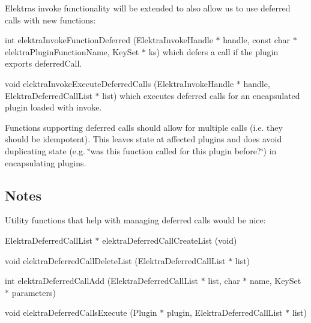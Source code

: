 \begin{DoxyItemize}
\item Elektra\textquotesingle{}s invoke functionality will be extended to also allow us to use deferred calls with new functions\+:
\item {\ttfamily int elektra\+Invoke\+Function\+Deferred (Elektra\+Invoke\+Handle $\ast$ handle, const char $\ast$ elektra\+Plugin\+Function\+Name, Key\+Set $\ast$ ks)} which defers a call if the plugin exports {\ttfamily deferred\+Call}.
\item {\ttfamily void elektra\+Invoke\+Execute\+Deferred\+Calls (Elektra\+Invoke\+Handle $\ast$ handle, Elektra\+Deferred\+Call\+List $\ast$ list)} which executes deferred calls for an encapsulated plugin loaded with invoke.
\item Functions supporting deferred calls should allow for multiple calls (i.\+e. they should be idempotent). This leaves state at affected plugins and does avoid duplicating state (e.\+g. \char`\"{}was this function called for this plugin before?\char`\"{}) in encapsulating plugins.
\end{DoxyItemize}

\subsection*{Notes}

Utility functions that help with managing deferred calls would be nice\+:


\begin{DoxyItemize}
\item {\ttfamily Elektra\+Deferred\+Call\+List $\ast$ elektra\+Deferred\+Call\+Create\+List (void)}
\item {\ttfamily void elektra\+Deferred\+Call\+Delete\+List (Elektra\+Deferred\+Call\+List $\ast$ list)}
\item {\ttfamily int elektra\+Deferred\+Call\+Add (Elektra\+Deferred\+Call\+List $\ast$ list, char $\ast$ name, Key\+Set $\ast$ parameters)}
\item {\ttfamily void elektra\+Deferred\+Calls\+Execute (Plugin $\ast$ plugin, Elektra\+Deferred\+Call\+List $\ast$ list)} 
\end{DoxyItemize}